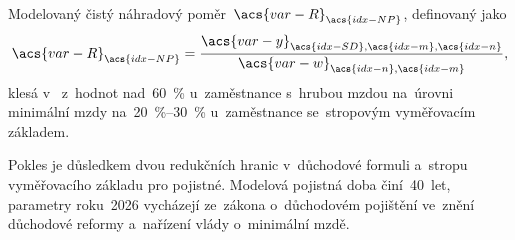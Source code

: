 Modelovaný čistý náhradový poměr~$\acs{var-R}_{\acs{idx-NP}}$, definovaný jako
\begin{equation}\label{eq:replacement_rate}
  \acs{var-R}_{\acs{idx-NP}}
    = \frac{\acs{var-y}_{\acs{idx-SD},\acs{idx-m},\acs{idx-n}}}
           {\acs{var-w}_{\acs{idx-n},\acs{idx-m}}},
\end{equation}
klesá v~ z~hodnot nad~\SI{60}{\percent} u~zaměstnance s~hrubou mzdou na~úrovni minimální mzdy na~\SIrange{20}{30}{\percent} u~zaměstnance se~stropovým vyměřovacím základem.

Pokles je důsledkem dvou redukčních hranic v~důchodové formuli a~stropu vyměřovacího základu pro pojistné. Modelová pojistná doba činí~40~let, parametry roku~2026 vycházejí ze~zákona o~důchodovém pojištění ve~znění důchodové reformy a~nařízení vlády o~minimální mzdě.~\cite{zakon_zpds_1995}~\cite{zakon_duchreforma_2023}~\cite{nv_365_2025}


